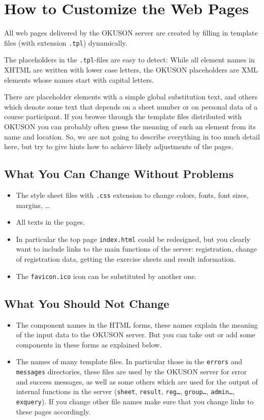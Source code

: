 \documentclass[12pt,openany,a4paper]{book}
\newcommand{\OKUSON}{\textsf{OKUSON}}
\begin{document}
\section{How to Customize the Web Pages}

All web pages delivered by the  {\OKUSON} server are created by filling in
template files (with extension \texttt{.tpl}) dynamically.

The placeholders in  the \texttt{.tpl}-files are easy to detect: While all
element names in XHTML are written with lower case letters, the 
{\OKUSON} placeholders are XML elements whose names start with  capital
letters.

There are placeholder elements with a simple global substitution text, and
others which denote some text that depends on a sheet number or on personal
data of a course participant. If you browse through the template files
distributed with {\OKUSON} you can probably often guess the meaning of such
an element from its name and location. So, we are not going to describe
everything in too much detail here, but try to give hints how to achieve likely
adjustments of the pages.

\subsection{What You Can Change Without Problems}

\begin{itemize}
\item The style sheet files with \texttt{.css} extension to change colors,
fonts, font sizes, margins, \ldots
\item All texts in the pages.
\item In particular the top page \texttt{index.html} could be 
redesigned, but you clearly want to include  links to the main functions of
the server: registration, change of registration data, getting the exercise
sheets and result information.
\item The \texttt{favicon.ico} icon can be substituted by another one.
\end{itemize}

\subsection{What You Should Not Change}

\begin{itemize}
\item The component names in the HTML forms, these names explain the meaning
of the input data to the {\OKUSON} server. But you can take out or add some
components in these forms as explained below.
\item The names of many template files. In particular those in the
\texttt{errors} and \texttt{messages} directories, these files are used by
the {\OKUSON} server for error and success messages, as well as some others
which are used for the output of  internal functions in the server
(\texttt{sheet}, \texttt{result}, \texttt{reg\ldots}, \texttt{group\ldots},
\texttt{admin\ldots}, \texttt{exquery}).
If you change other file names make sure that you change links to these 
pages accordingly.
\end{itemize}
\end{document}
